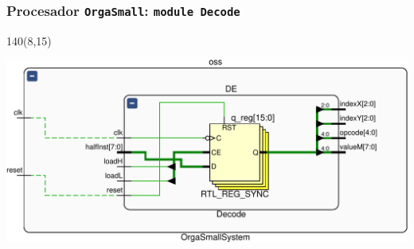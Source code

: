 \documentclass[aspectratio=169]{beamer}
\begin{document}
\begin{frame}[fragile,t]
    \frametitle{Procesador \texttt{OrgaSmall}: \texttt{module Decode}}
    \begin{textblock}{140}(8,15)
    \begin{center}
    \includegraphics[scale=0.74]{pdf/schematicDE-crop.pdf}
    \end{center}
    \end{textblock}
\end{frame}
\end{document}
